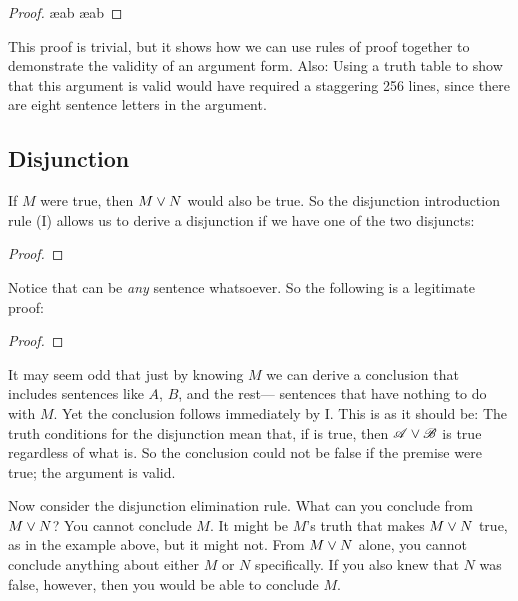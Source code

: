 \begin{proof}

	 \ae{ab}
	 \ae{ab}
	 
\end{proof}

This proof is trivial, but it shows how we can use rules of proof together to demonstrate the validity of an argument form. Also: Using a truth table to show that this argument is valid would have required a staggering 256 lines, since there are eight sentence letters in the argument.



\subsection{Disjunction}
If $M$ were true, then $M \vee N$ would also be true. So the disjunction introduction rule ({\eor}I) allows us to derive a disjunction if we have one of the two disjuncts:

\begin{proof}
\end{proof}

Notice that  can be \emph{any} sentence whatsoever. So the following is a legitimate proof:

\begin{proof}
\end{proof}

It may seem odd that just by knowing $M$ we can derive a conclusion that includes sentences like $A$, $B$, and the rest--- sentences that have nothing to do with $M$. Yet the conclusion follows immediately by {\eor}I. This is as it should be: The truth conditions for the disjunction mean that, if  is true, then $\mathscr{A}\vee \mathscr{B}$ is true regardless of what  is. So the conclusion could not be false if the premise were true; the argument is valid.

Now consider the disjunction elimination rule. What can you conclude from $M \vee N$? You cannot conclude $M$. It might be $M$'s truth that makes $M \vee N$ true, as in the example above, but it might not. From $M \vee N$ alone, you cannot conclude anything about either $M$ or $N$ specifically. If you also knew that $N$ was false, however, then you would be able to conclude $M$.

